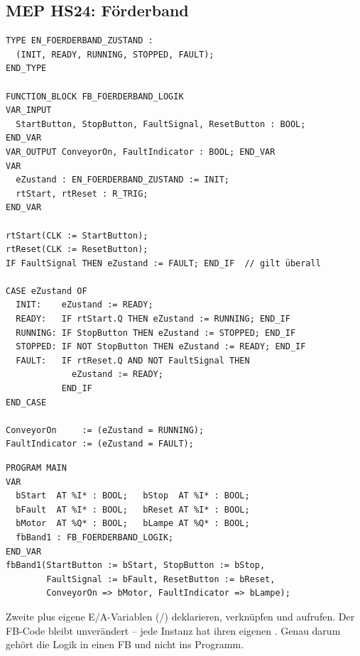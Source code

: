 \subsection{MEP HS24: Förderband}
\label{bsp:foerderband}
\begin{center}
\end{center}
\begin{lstlisting}
TYPE EN_FOERDERBAND_ZUSTAND :
  (INIT, READY, RUNNING, STOPPED, FAULT);
END_TYPE

FUNCTION_BLOCK FB_FOERDERBAND_LOGIK
VAR_INPUT
  StartButton, StopButton, FaultSignal, ResetButton : BOOL;
END_VAR
VAR_OUTPUT ConveyorOn, FaultIndicator : BOOL; END_VAR
VAR
  eZustand : EN_FOERDERBAND_ZUSTAND := INIT;
  rtStart, rtReset : R_TRIG;
END_VAR

rtStart(CLK := StartButton);
rtReset(CLK := ResetButton);
IF FaultSignal THEN eZustand := FAULT; END_IF  // gilt überall

CASE eZustand OF
  INIT:    eZustand := READY;
  READY:   IF rtStart.Q THEN eZustand := RUNNING; END_IF
  RUNNING: IF StopButton THEN eZustand := STOPPED; END_IF
  STOPPED: IF NOT StopButton THEN eZustand := READY; END_IF
  FAULT:   IF rtReset.Q AND NOT FaultSignal THEN
             eZustand := READY;
           END_IF
END_CASE

ConveyorOn     := (eZustand = RUNNING);
FaultIndicator := (eZustand = FAULT);
\end{lstlisting}
\begin{lstlisting}
PROGRAM MAIN
VAR
  bStart  AT %I* : BOOL;   bStop  AT %I* : BOOL;
  bFault  AT %I* : BOOL;   bReset AT %I* : BOOL;
  bMotor  AT %Q* : BOOL;   bLampe AT %Q* : BOOL;
  fbBand1 : FB_FOERDERBAND_LOGIK;
END_VAR
fbBand1(StartButton := bStart, StopButton := bStop,
        FaultSignal := bFault, ResetButton := bReset,
        ConveyorOn => bMotor, FaultIndicator => bLampe);
\end{lstlisting}
\begin{formel}
\label{falle:instanz}
Zweite   plus eigene
E/A-Variablen (/) deklarieren, verknüpfen und
 aufrufen. Der FB-Code bleibt unverändert -- jede Instanz
hat ihren eigenen . Genau darum gehört die Logik in einen FB
und nicht ins Programm.
\end{formel}

